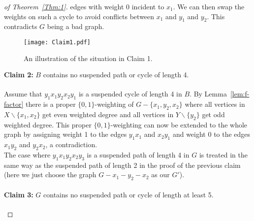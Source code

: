 \documentclass[
final,
 nomarks,
]{dmtcs-episciences}
\theoremstyle{definition}
\begin{document}
\begin{proof}[of Theorem~\ref{Thm:1}]
edges with weight 0 incident to $x_1$. We can then swap the weights on such a cycle to avoid conflicts between $x_1$ and $y_1$ and $y_2$. This contradicts $G$ being a bad graph. 
\begin{figure}[H]
\centering 
\texttt{[image: Claim1.pdf]}
\caption{An illustration of the situation in Claim 1.}
\label{fig:claim1}
\end{figure} 




\noindent \textbf{Claim 2:} $B$ contains no suspended path or cycle of length 4. \\ \\
Assume that $y_1x_1y_2x_2y_1$ is a suspended cycle of length 4 in $B$. By Lemma~\ref{lem:f-factor} there is a proper $\{0,1\}$-weighting of $G-\{x_1,y_2,x_2\}$ where all vertices in $X \backslash \{x_1,x_2\}$ get even weighted degree and all vertices in $Y \backslash \{y_2\}$ get odd weighted degree. This proper $\{0,1\}$-weighting can now be extended to the whole graph by assigning weight 1 to the edges $y_1x_1$ and $x_2y_1$ and weight 0 to the edges $x_1y_2$ and $y_2x_2$, a contradiction. \\
The case where $y_1x_1y_2x_2y_3$ is a suspended path of length 4 in $G$ is treated in the same way as the suspended path of length 2 in the proof of the previous claim (here we just choose the graph $G-x_1-y_2-x_2$ as our $G'$). \\ \\
\textbf{Claim 3:} $G$ contains no suspended path or cycle of length at least 5. \\ \\

\end{proof}
\end{document}
